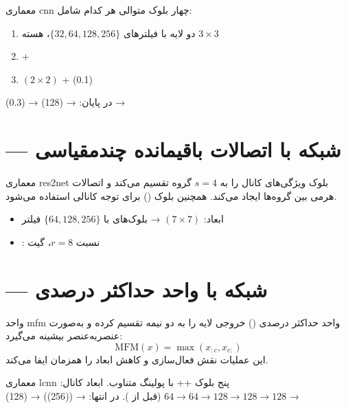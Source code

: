 \documentclass[12pt]{report}
\begin{document}
\begin{tecbox}{معماری }{cnn}
    چهار بلوک متوالی هر کدام شامل:
    \begin{enumerate}[noitemsep]
        \item دو لایه  با فیلترهای $\{32, 64, 128, 256\}$، هسته $3{\times}3$
        \item {} + 
        \item {}$(2{\times}2)$ + (0.1)
    \end{enumerate}
    در پایان:  → (128) → (0.3) → 
\end{tecbox}

\section{ — شبکه با اتصالات باقیمانده چندمقیاسی}

\begin{tecbox}{معماری }{res2net}
    بلوک  ویژگی‌های کانال را به $s=4$ گروه تقسیم می‌کند و
    اتصالات هرمی بین گروه‌ها ایجاد می‌کند. همچنین بلوک 
    () برای توجه کانالی استفاده می‌شود.
    \begin{itemize}[noitemsep]
        \item ابعاد: $(7{\times}7)$ → بلوک‌های  با $\{64, 128, 256\}$ فیلتر
        \item {}: نسبت $r=8$،  گیت
    \end{itemize}
\end{tecbox}

\section{ — شبکه با واحد حداکثر درصدی}

\begin{dfnbox}{واحد }{mfm}
    واحد حداکثر درصدی () خروجی لایه را به دو نیمه
    تقسیم کرده و به‌صورت عنصربه‌عنصر بیشینه می‌گیرد:
    \[
        \text{MFM}(x) = \max(x_{:c}, x_{c:})
    \]
    این عملیات نقش فعال‌سازی و کاهش ابعاد را همزمان ایفا می‌کند.
\end{dfnbox}

\begin{tecbox}{معماری }{lcnn}
    پنج بلوک ++ با پولینگ متناوب.
    ابعاد کانال: $64 \to 64 \to 128 \to 128 \to 128$ (قبل از ).
    در انتها:  → ((256)) → (128) → 
\end{tecbox}
\end{document}
